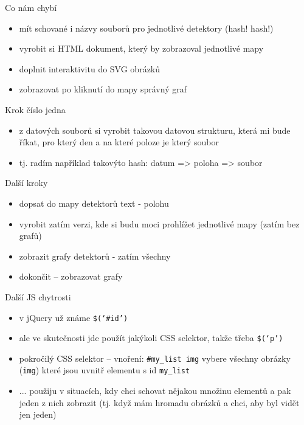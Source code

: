 \documentclass{beamer}
\begin{document}
\begin{frame}{Co nám chybí}
  \begin{itemize}
    \item mít schované i názvy souborů pro jednotlivé detektory (hash! hash!)
    \item vyrobit si HTML dokument, který by zobrazoval jednotlivé mapy
    \item doplnit interaktivitu do SVG obrázků
    \item zobrazovat po kliknutí do mapy správný graf
  \end{itemize}
\end{frame}

\begin{frame}{Krok číslo jedna}
  \begin{itemize}
    \item z datových souborů si vyrobit takovou datovou strukturu, která mi bude říkat, pro který den a na které poloze je který soubor
    \item tj. radím například takovýto hash: {datum => {poloha => soubor}}
  \end{itemize}
\end{frame}

\begin{frame}{Další kroky}
  \begin{itemize}
    \item dopsat do mapy detektorů text - polohu
    \item vyrobit zatím verzi, kde si budu moci prohlížet jednotlivé mapy (zatím bez grafů)
    \item zobrazit grafy detektorů - zatím všechny
    \item dokončit -- zobrazovat grafy
  \end{itemize}
\end{frame}

\begin{frame}{Další JS chytrosti}
  \begin{itemize}
    \item v jQuery už známe \texttt{\$(`\#id')}
    \item ale ve skutečnosti jde použít jakýkoli CSS selektor, takže třeba \texttt{\$(`p')}
    \item pokročilý CSS selektor -- vnoření: \texttt{\#my\_list img} vybere všechny obrázky (\texttt{img}) které jsou uvnitř elementu s id \texttt{my\_list}
    \item ... použiju v situacích, kdy chci schovat nějakou množinu elementů a pak jeden z nich zobrazit (tj. když mám hromadu obrázků a chci, aby byl vidět jen jeden)
  \end{itemize}
\end{frame}
\end{document}
